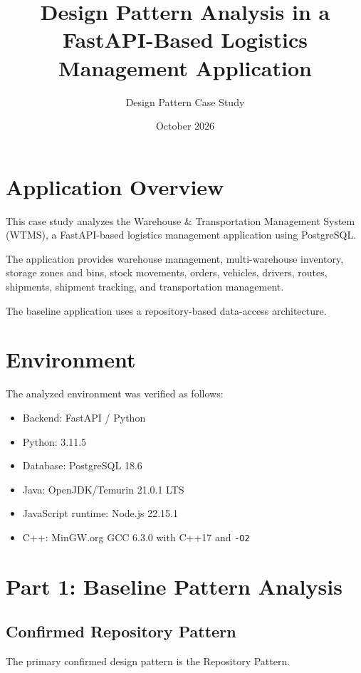 \documentclass[12pt,a4paper]{article}
\title{Design Pattern Analysis in a FastAPI-Based Logistics Management Application}
\author{Design Pattern Case Study}
\date{October 2026}
\begin{document}
\maketitle

\tableofcontents
\newpage

\section{Application Overview}

This case study analyzes the Warehouse \& Transportation Management System (WTMS), a FastAPI-based logistics management application using PostgreSQL.

The application provides warehouse management, multi-warehouse inventory, storage zones and bins, stock movements, orders, vehicles, drivers, routes, shipments, shipment tracking, and transportation management.

The baseline application uses a repository-based data-access architecture.

\section{Environment}

The analyzed environment was verified as follows:

\begin{itemize}
    \item Backend: FastAPI / Python
    \item Python: 3.11.5
    \item Database: PostgreSQL 18.6
    \item Java: OpenJDK/Temurin 21.0.1 LTS
    \item JavaScript runtime: Node.js 22.15.1
    \item C++: MinGW.org GCC 6.3.0 with C++17 and \texttt{-O2}
\end{itemize}

\section{Part 1: Baseline Pattern Analysis}

\subsection{Confirmed Repository Pattern}

The primary confirmed design pattern is the Repository Pattern.
\end{document}
